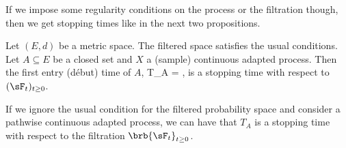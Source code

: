 If we impose some regularity conditions on the process or the filtration though, then we get stopping times like in the next two propositions.

\begin{proposition}\label{pro:debut_time_closed_set_stopping_time}%
Let $(E,d)$ be a metric space. The filtered space satisfies the usual conditions. Let $A\subseteq E$ be a closed set and $X$ a (sample) continuous adapted process. Then the first entry (d\'ebut) time of $A$,
\be
T_A = \inf{},
\ee
is a stopping time with respect to $(\sF_t)_{t\geq 0}$.

If we ignore the usual condition for the filtered probability space and consider a pathwise continuous adapted process, we can have that $T_A$ is a stopping time with respect to the filtration $\brb{\sF_{t}}_{t\geq 0}$.
\end{proposition}

